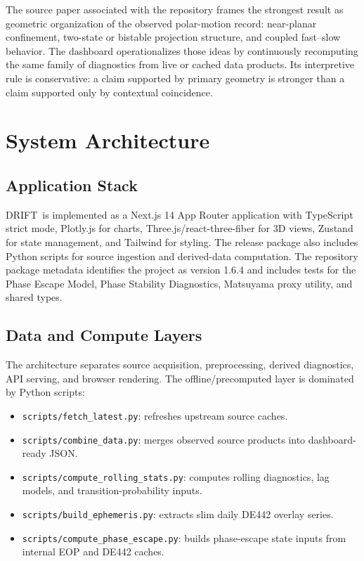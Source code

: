 \documentclass[11pt]{article}
\newcommand{\DRIFT}{\textsc{DRIFT}}
\begin{document}
The source paper associated with the repository frames the strongest result as geometric organization of the observed polar-motion record: near-planar confinement, two-state or bistable projection structure, and coupled fast--slow behavior. The dashboard operationalizes those ideas by continuously recomputing the same family of diagnostics from live or cached data products. Its interpretive rule is conservative: a claim supported by primary geometry is stronger than a claim supported only by contextual coincidence.

\section{System Architecture}
\subsection{Application Stack}
\DRIFT\ is implemented as a Next.js 14 App Router application with TypeScript strict mode, Plotly.js for charts, Three.js/react-three-fiber for 3D views, Zustand for state management, and Tailwind for styling. The release package also includes Python scripts for source ingestion and derived-data computation. The repository package metadata identifies the project as version 1.6.4 and includes tests for the Phase Escape Model, Phase Stability Diagnostics, Matsuyama proxy utility, and shared types.

\subsection{Data and Compute Layers}
The architecture separates source acquisition, preprocessing, derived diagnostics, API serving, and browser rendering. The offline/precomputed layer is dominated by Python scripts:
\begin{itemize}
\item \texttt{scripts/fetch\_latest.py}: refreshes upstream source caches.
\item \texttt{scripts/combine\_data.py}: merges observed source products into dashboard-ready JSON.
\item \texttt{scripts/compute\_rolling\_stats.py}: computes rolling diagnostics, lag models, and transition-probability inputs.
\item \texttt{scripts/build\_ephemeris.py}: extracts slim daily DE442 overlay series.
\item \texttt{scripts/compute\_phase\_escape.py}: builds phase-escape state inputs from internal EOP and DE442 caches.
\end{itemize}
\end{document}
